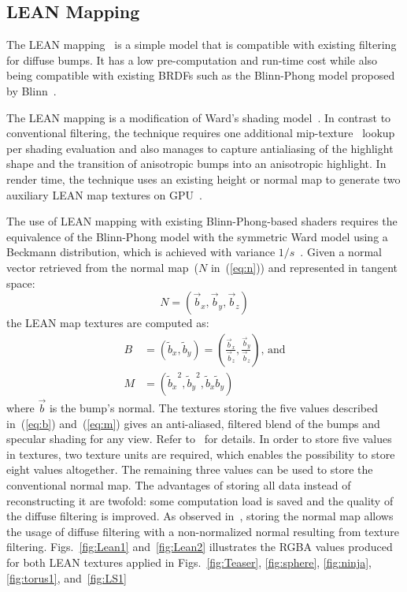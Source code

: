 \documentclass[10pt, conference]{IEEEtran}
\begin{document}
\subsection{LEAN Mapping}
%
The LEAN mapping~\cite{Olano:2010:LM:1730804.1730834} is a simple model that is compatible with existing filtering for diffuse bumps. It has a low pre-computation and run-time cost while also being compatible with existing BRDFs such as the Blinn-Phong model proposed by Blinn~\cite{Blinn:1977:MLR:563858.563893}.

The LEAN mapping is a modification of Ward's shading model~\cite{Ward:1992:MMA:133994.134078}. In contrast to conventional filtering, the technique requires one additional mip-texture~\cite{Williams:1983:PP:800059.801126} lookup per shading evaluation and also manages to capture antialiasing of the highlight shape and the transition of anisotropic bumps into an anisotropic highlight. In render time, the technique uses an existing height or normal map to generate two auxiliary LEAN map textures on GPU~\cite{Olano:2010:LM:1730804.1730834}.

The use of LEAN mapping with existing Blinn-Phong-based shaders requires the equivalence of the Blinn-Phong model with the symmetric Ward model using a Beckmann distribution, which is achieved with variance \mbox{$1 / s$}~\cite{Olano:2010:LM:1730804.1730834}. Given a normal vector retrieved from the normal map~($N$ in~(\ref{eq:n})) and represented in tangent space:
\begin{equation}
	\label{eq:n}
	N = (\vec{b}_{x}, \vec{b}_{y}, \vec{b}_{z})
\end{equation}
the LEAN map textures are computed as:
\begin{align}
	\label{eq:b}
	B &= (\tilde{b}_{x}, \tilde{b}_{y}) = \left(\frac{\vec{b}_{x}}{\vec{b}_{z}}, \frac{\vec{b}_{y}}{\vec{b}_{z}}\right) \text{, and}\\
	\label{eq:m}
	M &= ({\tilde{b}_{x}}^{2}, {\tilde{b}_{y}}^{2}, \tilde{b}_{x}\tilde{b}_{y})
\end{align}
where $\vec{b}$ is the bump's normal. The textures storing the five values described in~(\ref{eq:b}) and~(\ref{eq:m}) gives an anti-aliased, filtered blend of the bumps and specular shading for any view. Refer to~\cite{Olano:2010:LM:1730804.1730834} for details. In order to store five values in textures, two texture units are required, which enables the possibility to store eight values altogether. The remaining three values can be used to store the conventional normal map. The advantages of storing all data instead of reconstructing it are twofold: some computation load is saved and the quality of the diffuse filtering is improved. As observed in~\cite{Kilgard00apractical}, storing the normal map allows the usage of diffuse filtering with a non-normalized normal resulting from texture filtering. Figs.~\ref{fig:Lean1} and~\ref{fig:Lean2} illustrates the RGBA values produced for both LEAN textures applied in Figs.~\ref{fig:Teaser}, \ref{fig:sphere}, \ref{fig:ninja}, \ref{fig:torus1}, and~\ref{fig:LS1}
\end{document}

